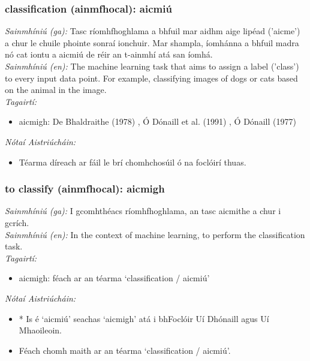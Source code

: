 \subsubsection*{classification (ainmfhocal): aicmiú}
 \noindent \textit{Sainmhíniú (ga):} Tasc ríomhfhoghlama a bhfuil mar aidhm aige lipéad ('aicme') a chur le chuile phointe sonraí ionchuir. Mar shampla, íomhánna a bhfuil madra nó cat iontu a aicmiú de réir an t-ainmhí atá san íomhá.
\\
 \noindent \textit{Sainmhíniú (en):} The machine learning task that aims to assign a label ('class') to every input data point. For example, classifying images of dogs or cats based on the animal in the image.
\\
 \noindent \textit{Tagairtí:}
\begin{itemize}
	\item aicmigh: De Bhaldraithe (1978) \cite{de-bhaldraithe}, Ó Dónaill et al. (1991) \cite{focloir-beag}, Ó Dónaill (1977) \cite{odonaill}
\end{itemize}

 \noindent \textit{Nótaí Aistriúcháin:}
\begin{itemize}
	\item Téarma díreach ar fáil le brí chomhchosúil ó na foclóirí thuas.
\end{itemize}


\subsubsection*{to classify (ainmfhocal): aicmigh}
 \noindent \textit{Sainmhíniú (ga):} I gcomhthéacs ríomhfhoghlama, an tasc aicmithe a chur i gcrích.
\\
 \noindent \textit{Sainmhíniú (en):} In the context of machine learning, to perform the classification task.
\\
 \noindent \textit{Tagairtí:}
\begin{itemize}
	\item aicmigh: féach ar an téarma `classification / aicmiú'
\end{itemize}

 \noindent \textit{Nótaí Aistriúcháin:}
\begin{itemize}
	\item * Is é `aicmiú' seachas `aicmigh' atá i bhFoclóir Uí Dhónaill agus Uí Mhaoileoin.
	\item Féach chomh maith ar an téarma `classification / aicmiú'.
\end{itemize}


